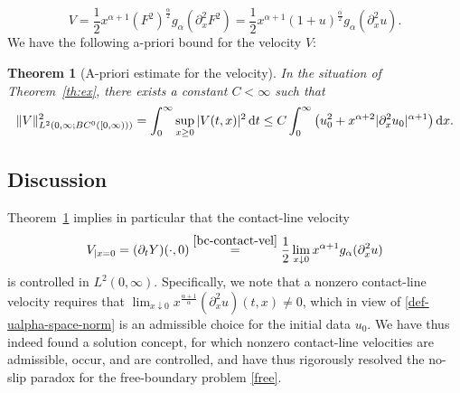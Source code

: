 \documentclass[reqno,12pt]{amsart}
\renewcommand{\d}{\ensuremath{\mathrm{d}}}
\renewcommand{\d}{\ensuremath{{\rm d}}}
\newtheorem{theorem}{Theorem}[section]
\numberwithin{equation}{section}
\begin{document}
%
\begin{equation}\label{velocity}
V = \frac 1 2 x^{\alpha+1} (F^2)^{\frac\alpha 2} g_\alpha(\partial_x^2 F^2) = \frac 1 2 x^{\alpha+1} (1+u)^{\frac\alpha 2} g_\alpha(\partial_x^2 u).
\end{equation}
%
We have the following a-priori bound for the velocity $V$:
%
\begin{theorem}[A-priori estimate for the velocity]\label{th-velocity}
In the situation of Theorem~\ref{th:ex}, there exists a constant $C < \infty$ such that
%
\begin{equation}\label{a-priori-contact-vel}
\|V\|_{L^2(0,\infty;BC^0([0,\infty)))}^2 = \int_0^\infty \sup_{x \ge 0} |V(t,x)|^2 \, \d t \le C \int_0^\infty \big(u_0^2 + x^{\alpha+2} |\partial_x^2 u_0|^{\alpha+1}\big) \, \d x.
\end{equation}
%
\end{theorem}
%

%
\subsection{Discussion}
%
Theorem~\ref{th-velocity} implies in particular that the contact-line velocity
%
\[
V_{|x = 0} = (\partial_t Y)(\cdot,0) \stackrel{\eqref{bc-contact-vel}}{=} \frac 1 2 \lim_{x\downarrow0} x^{\alpha+1} g_\alpha(\partial_x^2 u)
\]
%
is controlled in $L^2(0,\infty)$. Specifically, we note that a nonzero contact-line velocity requires that $\lim_{x \downarrow 0} x^{\frac{\alpha+1}{\alpha}} (\partial_x^2 u)(t,x) \ne 0$, which in view of \eqref{def-ualpha-space-norm} is an admissible choice for the initial data $u_0$. We have thus indeed found a solution concept, for which nonzero contact-line velocities are admissible, occur, and are controlled, and have thus rigorously resolved the no-slip paradox for the free-boundary problem \eqref{free}. 

%
\bigskip
%
\end{document}
